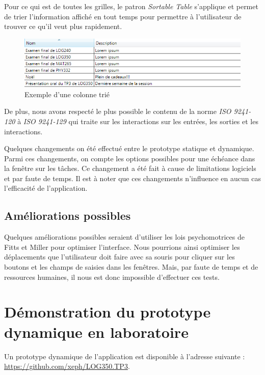 \documentclass[letterpaper, oneside, 12pt, these, creativecommons]{thETS}
\begin{document}
Pour ce qui est de toutes les grilles, le patron \emph{Sortable Table} s'applique et permet de trier l'information affiché en tout temps pour permettre à l'utilisateur de trouver ce qu'il veut plus rapidement.

\begin{figure}[H!]
	\centering
	\includegraphics[width=1\textwidth]{sortable_table.png}
	\caption{Exemple d'une colonne trié}
\end{figure}

De plus, nous avons respecté le plus possible le contenu de la norme \emph{ISO 9241-120} à \emph{ISO 9241-129} qui traite sur les interactions sur les entrées, les sorties et les interactions.

Quelques changements on été effectué entre le prototype statique et dynamique. Parmi ces changements, on compte les options possibles pour une échéance dans la fenêtre sur les tâches. Ce changement a été fait à cause de limitations logiciels et par faute de temps. Il est à noter que ces changements n'influence en aucun cas l'efficacité de l'application.

\section{Améliorations possibles}

Quelques améliorations possibles seraient d'utiliser les lois psychomotrices de Fitts et Miller pour optimiser l'interface. Nous pourrions ainsi optimiser les déplacements que l'utilisateur doit faire avec sa souris pour cliquer sur les boutons et les champs de saisies dans les fenêtres. Mais, par faute de temps et de ressources humaines, il nous est donc impossible d'effectuer ces tests.

\chapter{Démonstration du prototype dynamique en laboratoire}

Un prototype dynamique de l'application est disponible à l'adresse suivante : \\
\url{https://github.com/xeph/LOG350.TP3}.
\end{document}
